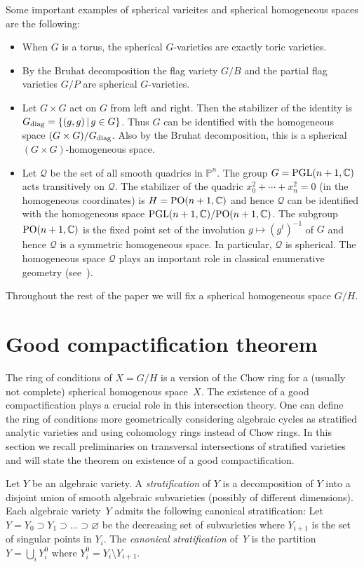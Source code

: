 \documentclass[pdftex]{sigma}
\def \C{\mathbb{C}}
\def \p{\mathbb{P}}
\numberwithin{equation}{section}
\theoremstyle{definition}
\begin{document}
Some important examples of spherical varieites and spherical homogeneous spaces are the following:
\begin{itemize}\itemsep=0pt
\item[(1)] When $G$ is a torus, the spherical $G$-varieties are exactly toric varieties.
\item[(2)] By the Bruhat decomposition the flag variety $G/B$ and the partial flag varieties $G/P$ are spherical $G$-varieties.
\item[(3)] Let $G \times G$ act on $G$ from left and right. Then the stabilizer of the identity is $G_{{\rm diag}} = \{(g, g) \,|\, g \in G\}$. Thus $G$ can be identified with the homogeneous space $(G \times G) / G_{{\rm diag}}$. Also by the Bruhat decomposition, this is a spherical $(G \times G)$-homogeneous space.
\item[(4)] Let $\mathcal{Q}$ be the set of all smooth quadrics in $\p^n$. The group $G = {\rm PGL}(n+1,\C)$ acts transitively on $\mathcal{Q}$.
The stabilizer of the quadric $x_0^2 + \cdots + x_n^2 = 0$ (in the homogeneous coordinates) is $H = {\rm PO}(n+1, \C)$ and hence $\mathcal{Q}$ can be identified with the
homogeneous space ${\rm PGL}(n+1, \C) / {\rm PO}(n+1, \C)$. The subgroup ${\rm PO}(n+1,\C)$ is the fixed point set of the involution $g \mapsto (g^t)^{-1}$ of $G$ and hence
$\mathcal{Q}$ is a symmetric homogeneous space. In particular, $\mathcal{Q}$ is spherical.
The homogeneous space $\mathcal{Q}$ plays an important role in classical enumerative geometry (see~\cite{DP}).
\end{itemize}

Throughout the rest of the paper we will fix a spherical homogeneous space $G/H$.

\section{Good compactification theorem} \label{sec-good- compactification}
The ring of conditions of $X=G/H$ is a version of the Chow ring for a (usually not complete) spherical homogenous space~$X$. The existence of a good compactification plays a crucial role in this intersection theory. One can define the ring of conditions more geometrically considering algebraic cycles as stratified analytic varieties and using cohomology rings instead of Chow rings. In this section we recall preliminaries on transversal intersections of stratified varieties and will state the theorem on existence of a good compactification.

Let $Y$ be an algebraic variety. A {\it stratification} of $Y$ is a decomposition of $Y$ into a disjoint union of smooth algebraic subvarieties (possibly of different dimensions). Each algebraic variety~$Y$ admits the following canonical stratification: Let $Y=Y_0\supset Y_1\supset\dots \supset \varnothing$ be the decreasing set of subvarieties where $Y_{i+1}$ is the set of singular points in $Y_i$. The {\it canonical stratification} of~$Y$ is the partition $Y=\bigcup_i Y_i^0$ where $Y_i^0=Y_i\setminus Y_{i+1}.$
\end{document}
